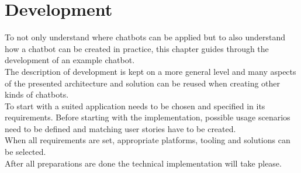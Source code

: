 \chapter{Development}


To not only understand where chatbots can be applied but to also understand how a chatbot can be created in practice, this chapter guides through the development of an example chatbot.
\\
The description of development is kept on a more general level and many aspects of the presented architecture and solution can be reused when creating other kinds of chatbots.
\\

To start with a suited application needs to be chosen and specified in its requirements.
Before starting with the implementation, possible usage scenarios need to be defined and matching user stories have to be created.
\\
When all requirements are set, appropriate platforms, tooling and solutions can be selected.
\\
After all preparations are done the technical implementation will take please.
